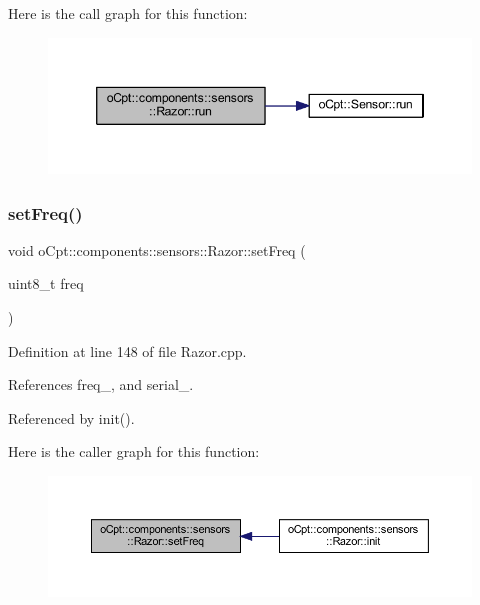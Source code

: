 Here is the call graph for this function\+:\nopagebreak
\begin{figure}[H]
\begin{center}
\leavevmode
\includegraphics[width=346pt]{classo_cpt_1_1components_1_1sensors_1_1_razor_ad93891ffb2d47e56d1417f0a40026c6e_cgraph}
\end{center}
\end{figure}
\hypertarget{classo_cpt_1_1components_1_1sensors_1_1_razor_a77cdeb877826fce3a12fec0ed3035478}{}\label{classo_cpt_1_1components_1_1sensors_1_1_razor_a77cdeb877826fce3a12fec0ed3035478} 
\subsubsection{\texorpdfstring{set\+Freq()}{setFreq()}}
{\footnotesize\ttfamily void o\+Cpt\+::components\+::sensors\+::\+Razor\+::set\+Freq (\begin{DoxyParamCaption}\item[{uint8\+\_\+t}]{freq }\end{DoxyParamCaption})}



Definition at line 148 of file Razor.\+cpp.



References freq\+\_\+, and serial\+\_\+.



Referenced by init().

Here is the caller graph for this function\+:
\nopagebreak
\begin{figure}[H]
\begin{center}
\leavevmode
\includegraphics[width=350pt]{classo_cpt_1_1components_1_1sensors_1_1_razor_a77cdeb877826fce3a12fec0ed3035478_icgraph}
\end{center}
\end{figure}
\hypertarget{classo_cpt_1_1components_1_1sensors_1_1_razor_a0f251fe3b51bf1a96b5d1e14e69a6d57}{}\label{classo_cpt_1_1components_1_1sensors_1_1_razor_a0f251fe3b51bf1a96b5d1e14e69a6d57} 
